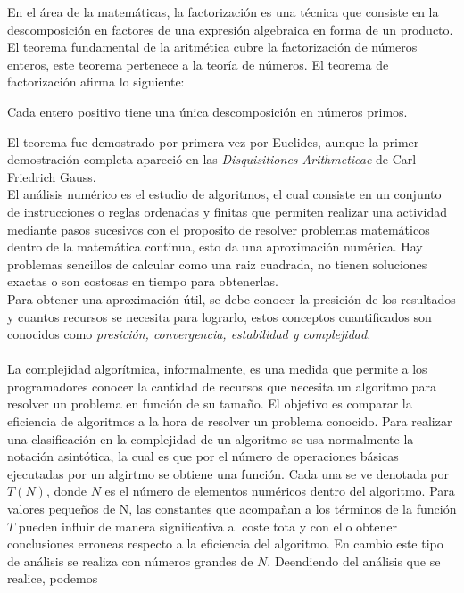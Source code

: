 En el área de la matemáticas, la factorización es una técnica que consiste en la descomposición en factores de una expresión algebraica
en forma de un producto. El teorema fundamental de la aritmética cubre la factorización de números enteros, este teorema pertenece a la teoría
de números. El teorema de factorización afirma lo siguiente:
\begin{teor}
    Cada entero positivo tiene una única descomposición en números primos.
    \label{teo:enterosprimos}
\end{teor}
El teorema fue demostrado por primera vez por Euclides, aunque la primer demostración completa apareció en las \textit{Disquisitiones Arithmeticae}
de Carl Friedrich Gauss.\\
El análisis numérico es el estudio de algoritmos, el cual consiste en un conjunto de instrucciones o reglas ordenadas y finitas que permiten
realizar una actividad mediante pasos sucesivos con el proposito de resolver problemas matemáticos dentro de la matemática continua, esto da 
una aproximación numérica. Hay problemas sencillos de calcular como una raiz cuadrada, no tienen soluciones exactas o son costosas en tiempo
para obtenerlas.\\
Para obtener una aproximación útil, se debe conocer la presición de los resultados y cuantos recursos se necesita para lograrlo, estos conceptos
cuantificados son conocidos como \textit{presición, convergencia, estabilidad y complejidad.}\\\\
La complejidad algorítmica, informalmente, es una medida que permite a los programadores conocer la cantidad de recursos que necesita un algoritmo para resolver un problema en función de su tamaño. El objetivo es
comparar la eficiencia de algoritmos a la hora de resolver un problema conocido\cite{Cohen1998}. Para realizar una clasificación en la complejidad de un algoritmo
se usa normalmente la notación asintótica, la cual es que por el número de operaciones básicas ejecutadas por un algirtmo se obtiene una función. Cada
una se ve denotada por $T(N)$, donde $N$ es el número de elementos numéricos dentro del algoritmo. Para valores pequeños de N, las constantes 
que acompañan a los términos de la función $T$ pueden influir de manera significativa al coste tota y con ello obtener conclusiones erroneas respecto
a la eficiencia del algoritmo. En cambio este tipo de análisis se realiza con números grandes de $N$. Deendiendo del análisis que se realice, podemos
